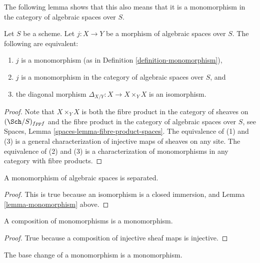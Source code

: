 \noindent
The following lemma shows that this also means that it is a monomorphism
in the category of algebraic spaces over $S$.

\begin{lemma}
\label{lemma-monomorphism}
Let $S$ be a scheme.
Let $j : X \to Y$ be a morphism of algebraic spaces over $S$.
The following are equivalent:
\begin{enumerate}
\item $j$ is a monomorphism (as in Definition \ref{definition-monomorphism}),
\item $j$ is a monomorphism in the category of algebraic spaces over $S$, and
\item the diagonal morphism $\Delta_{X/Y} : X \to X \times_Y X$ is
an isomorphism.
\end{enumerate}
\end{lemma}

\begin{proof}
Note that $X \times_Y X$ is both the fibre product in the category of
sheaves on $(\Sch/S)_{fppf}$ and the fibre product in the category
of algebraic spaces over $S$, see
Spaces, Lemma \ref{spaces-lemma-fibre-product-spaces}.
The equivalence of (1) and (3) is a general characterization
of injective maps of sheaves on any site.
The equivalence of (2) and (3) is a characterization of monomorphisms
in any category with fibre products.
\end{proof}

\begin{lemma}
\label{lemma-monomorphism-separated}
A monomorphism of algebraic spaces is separated.
\end{lemma}

\begin{proof}
This is true because an isomorphism is a closed immersion,
and Lemma \ref{lemma-monomorphism} above.
\end{proof}

\begin{lemma}
\label{lemma-composition-monomorphism}
A composition of monomorphisms is a monomorphism.
\end{lemma}

\begin{proof}
True because a composition of injective sheaf maps is injective.
\end{proof}

\begin{lemma}
\label{lemma-base-change-monomorphism}
The base change of a monomorphism is a monomorphism.
\end{lemma}

